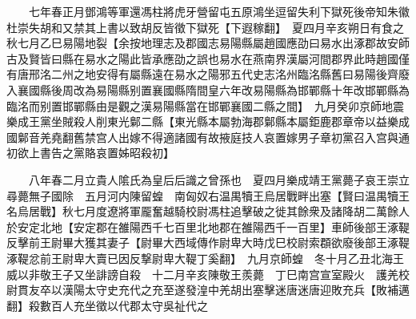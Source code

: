 　　七年春正月鄧鴻等軍還馮柱將虎牙營留屯五原鴻坐逗留失利下獄死後帝知朱徽杜崇失胡和又禁其上書以致胡反皆徵下獄死【下遐稼翻】　夏四月辛亥朔日有食之　秋七月乙巳易陽地裂【余按地理志及郡國志易陽縣屬趙國應劭曰易水出涿郡故安師古及賢皆曰縣在易水之陽此皆承應劭之誤也易水在燕南界漢屬河間郡界此時趙國僅有唐邢洺二州之地安得有屬縣遠在易水之陽邪五代史志洺州臨洺縣舊曰易陽後齊廢入襄國縣後周改為易陽縣别置襄國縣隋間皇六年改易陽縣為邯鄲縣十年改邯鄲縣為臨洺而别置邯鄲縣由是觀之漢易陽縣當在邯鄲襄國二縣之間】　九月癸卯京師地震　樂成王黨坐賊殺人削東光鄡二縣【東光縣本屬勃海郡鄡縣本屬鉅鹿郡章帝以益樂成國鄡音羌堯翻舊禁宫人出嫁不得適諸國有故掖庭技人哀置嫁男子章初黨召入宫與通初欲上書告之黨賂哀置姊昭殺初】

　　八年春二月立貴人隂氏為皇后后識之曾孫也　夏四月樂成靖王黨薨子哀王崇立尋薨無子國除　五月河内陳留蝗　南匈奴右温禺犢王烏居戰畔出塞【賢曰温禺犢王名烏居戰】秋七月度遼將軍龎奮越騎校尉馮柱追擊破之徙其餘衆及諸降胡二萬餘人於安定北地【安定郡在雒陽西千七百里北地郡在雒陽西千一百里】車師後部王涿鞮反擊前王尉畢大獲其妻子【尉畢大西域傳作尉卑大時戊巳校尉索頵欲廢後部王涿鞮涿鞮忿前王尉卑大賣已因反撃尉卑大鞮丁奚翻】　九月京師蝗　冬十月乙丑北海王威以非敬王子又坐誹謗自殺　十二月辛亥陳敬王羨薨　丁巳南宫宣室殿火　護羌校尉貫友卒以漢陽太守史充代之充至遂發湟中羌胡出塞擊迷唐迷唐迎敗充兵【敗補邁翻】殺數百人充坐徵以代郡太守吳祉代之

